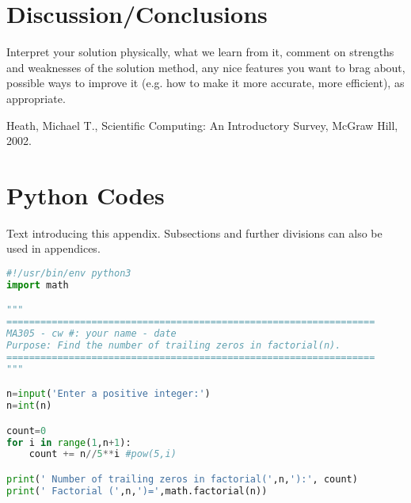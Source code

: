 \documentclass[11pt]{article}
\begin{document}
\section{Discussion/Conclusions}\label{S:5}
Interpret your solution physically, what we learn from it, comment on strengths and weaknesses of the solution method, any nice features you want to brag about, possible ways to improve it (e.g. how to make it more accurate, more efficient), as appropriate.


\begin{thebibliography}{100}
Heath, Michael T., Scientific Computing: An Introductory Survey, McGraw Hill, 2002.
%
%

\end{thebibliography}



\newpage
\appendix 
\setcounter{section}{0}           
\section{Python Codes}\label{S:A}
%
Text introducing this appendix. Subsections and further divisions can also be used in appendices. 

\begin{lstlisting}[language=Python]
#!/usr/bin/env python3 
import math

"""
=================================================================
MA305 - cw #: your name - date
Purpose: Find the number of trailing zeros in factorial(n). 
=================================================================
"""

n=input('Enter a positive integer:')
n=int(n)

count=0
for i in range(1,n+1):
    count += n//5**i #pow(5,i)

print(' Number of trailing zeros in factorial(',n,'):', count)
print(' Factorial (',n,')=',math.factorial(n))


\end{lstlisting} 
\end{document}
